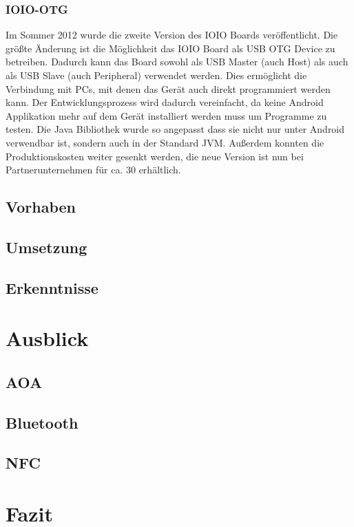 \documentclass[12pt,journal,compsoc]{IEEEtran}
\begin{document}
\subsubsection{IOIO-OTG}
Im Sommer 2012 wurde die zweite Version des IOIO Boards veröffentlicht.
Die größte Änderung ist die Möglichkeit das IOIO Board als USB OTG Device zu betreiben.
Dadurch kann das Board sowohl als USB Master (auch Host) als auch als USB Slave (auch Peripheral) verwendet werden.
Dies ermöglicht die Verbindung mit PCs, mit denen das Gerät auch direkt programmiert werden kann.
Der Entwicklungsprozess wird dadurch vereinfacht, da keine Android Applikation mehr auf dem Gerät installiert werden muss um Programme zu testen.
Die Java Bibliothek wurde so angepasst dass sie nicht nur unter Android verwendbar ist, sondern auch in der Standard JVM.
Außerdem konnten die Produktionskosten weiter gesenkt werden, die neue Version ist nun bei Partnerunternehmen für ca. 30\textdollar{} erhältlich.

\subsection{Vorhaben}

\subsection{Umsetzung}

\subsection{Erkenntnisse}





\section{Ausblick}
\subsection{AOA}

\subsection{Bluetooth}

\subsection{NFC}
\section{Fazit}









\nocite{*}
\end{document}
